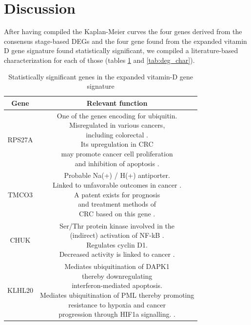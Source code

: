 \documentclass[fleqn,10pt]{SelfArx} %
\begin{document}
\section{Discussion}
After having compiled the Kaplan-Meier curves the four genes derived from the consensus stage-based DEGs and the four gene found from the expanded vitamin D gene signature found statistically significant, we compiled a literature-based characterization for each of those (tables \ref{tab:vit_char} and \ref{tab:deg_char}).
\begin{table}[ht]
	\centering
	\small
	\begin{tabular}{cc}
		\hline
		Gene & Relevant function\\
		\hline
		RPS27A & \makecell{One of the genes encoding for ubiquitin.\\Misregulated in various cancers,\\including colorectal \cite{n}.\\Its upregulation in CRC\\may promote cancer cell proliferation\\and inhibition of apoptosis \cite{o}.}\\
		TMCO3 & \makecell{Probable Na(+) / H(+) antiporter.\\Linked to unfavorable outcomes in cancer \cite{p}.\\A patent exists for prognosis\\and treatment methods of\\CRC based on this gene \cite{q}.}\\
		CHUK & \makecell{Ser/Thr protein kinase involved in the\\(indirect) activation of NF-kB \cite{f}.\\Regulates cyclin D1. \cite{g}\\Decreased activity is linked to cancer \cite{h}.}\\
		KLHL20 & \makecell{\cite{i} Mediates ubiquitination of DAPK1\\thereby downregulating\\interferon-mediated apoptosis. \cite{l}\\Mediates ubiquitination of PML thereby promoting\\resistance to hypoxia and cancer\\progression through HIF1a signalling. \cite{m}.}\\
		\hline
	\end{tabular}
	\caption{Statistically significant genes in the expanded vitamin-D gene signature}
	\label{tab:vit_char}
\end{table}
\end{document}
